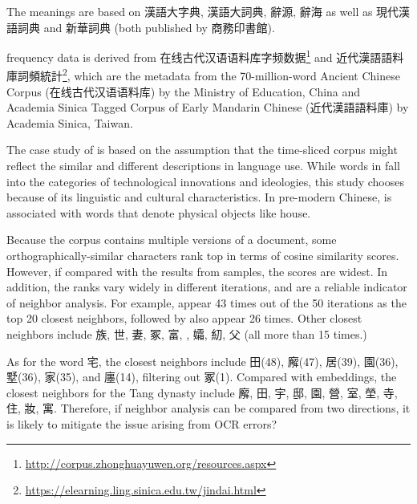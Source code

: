 The meanings are based on 漢語大字典, 漢語大詞典, 辭源, 辭海 as well as 現代漢語詞典 and 新華詞典 (both published by 商務印書館).

frequency data is derived from 在线古代汉语语料库字频数据\footnote{\url{http://corpus.zhonghuayuwen.org/resources.aspx}} and 近代漢語語料庫詞頻統計\footnote{\url{https://elearning.ling.sinica.edu.tw/jindai.html}}, which are the metadata from the 70-million-word Ancient Chinese Corpus (在线古代汉语语料库) by the Ministry of Education, China and Academia Sinica Tagged Corpus of Early Mandarin Chinese (近代漢語語料庫) by Academia Sinica, Taiwan.

The case study of \jia is based on the assumption that the time-sliced corpus might reflect the similar and different descriptions in language use. While words in  fall into the categories of technological innovations and ideologies, this study chooses \jia because of its linguistic and cultural characteristics. In pre-modern Chinese, \jia is associated with words that denote physical objects like house.

Because the corpus contains multiple versions of a document, some orthographically-similar characters rank top in terms of cosine similarity scores. However, if compared with the results from  samples, the scores are widest. In addition, the ranks vary widely in different iterations, and are a reliable indicator of neighbor analysis. For example,  appear 43 times out of the 50 iterations as the top 20 closest neighbors, followed by  also appear 26 times. Other closest neighbors include 族, 世, 妻, 冢, 富, , 孀, 糿, 父 (all more than 15 times.)

As for the word 宅, the closest neighbors include 田(48), 廨(47), 居(39), 園(36), 墅(36), 家(35), and 廛(14), filtering out 冢(1). Compared with  embeddings, the closest neighbors for the Tang dynasty include 廨, 田, 宇, 邸, 園, 營, 室, 塋, 寺, 住, 妝, 寓. Therefore, if neighbor analysis can be compared from two directions, it is likely to mitigate the issue arising from OCR errors?

